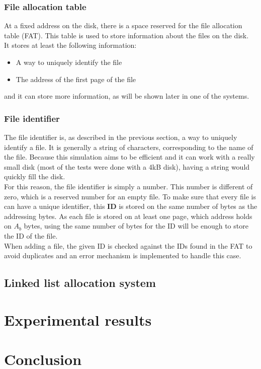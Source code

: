 \documentclass[10pt,a4paper]{ULBreport}
\begin{document}
\subsection{File allocation table}
At a fixed address on the disk, there is a space reserved for the file allocation table (FAT). This table is used to store information about the files on the disk. \\
It stores at least the following information:
\begin{itemize}
    \item A way to uniquely identify the file
    \item The address of the first page of the file
\end{itemize}
and it can store more information, as will be shown later in one of the systems.
\subsection{File identifier}
The file identifier is, as described in the previous section, a way to uniquely identify a file. It is generally a string of characters, corresponding to the name of the file. Because this simulation aims to be efficient and it can work with a really small disk (most of the tests were done with a 4kB disk), having a string would quickly fill the disk. \\
For this reason, the file identifier is simply a number. This number is different of zero, which is a reserved number for an empty file. To make sure that every file is can have a unique identifier, this \textbf{ID} is stored on the same number of bytes as the addressing bytes. As each file is stored on at least one page, which address holds on $A_b$ bytes, using the same number of bytes for the ID will be enough to store the ID of the file. \\
When adding a file, the given ID is checked against the IDs found in the FAT to avoid duplicates and an error mechanism is implemented to handle this case. 

\section{Linked list allocation system}
\label{sec:linkedlist}






\chapter{Experimental results}







\chapter{Conclusion}



\end{document}
